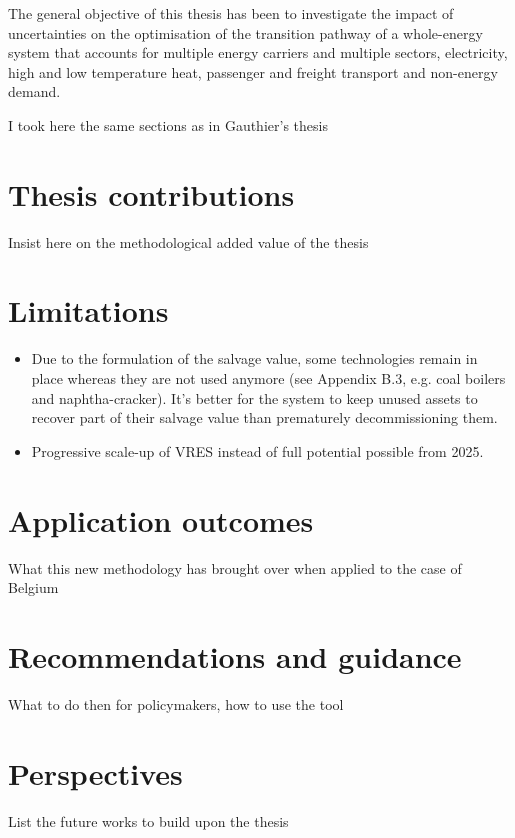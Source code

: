 
The general objective of this thesis has been to investigate the impact of uncertainties on the optimisation of the transition pathway of a whole-energy system that accounts for multiple energy carriers and multiple sectors, \ie electricity, high and low temperature heat, passenger and freight transport and non-energy demand. 




I took here the same sections as in Gauthier's thesis
\section*{Thesis contributions}
Insist here on the methodological added value of the thesis

\section*{Limitations}
\begin{itemize}
\item Due to the formulation of the salvage value, some technologies remain in place whereas they are not used anymore (see Appendix B.3, e.g. coal boilers and naphtha-cracker). It's better for the system to keep unused assets to recover part of their salvage value than prematurely decommissioning them.
\item Progressive scale-up of \gls{VRES} instead of full potential possible from 2025.
\end{itemize}

\section*{Application outcomes}
What this new methodology has brought over when applied to the case of Belgium

\section*{Recommendations and guidance}
What to do then for policymakers, how to use the tool

\section*{Perspectives}
List the future works to build upon the thesis

